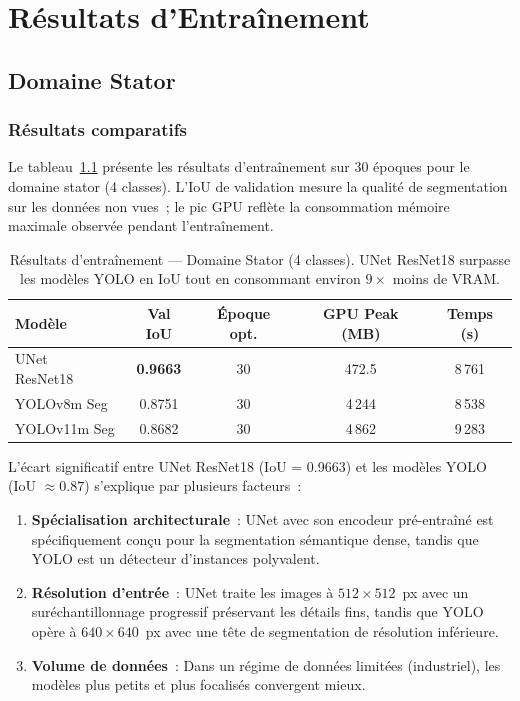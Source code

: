 \documentclass[12pt,a4paper]{report}
\begin{document}
\chapter{R\'esultats d'Entra\^inement}

\section{Domaine Stator}

\subsection{R\'esultats comparatifs}

Le tableau~\ref{tab:stator_results} pr\'esente les r\'esultats d'entra\^inement sur 30 \'epoques pour le domaine stator (4 classes). L'IoU de validation mesure la qualit\'e de segmentation sur les donn\'ees non vues~; le pic GPU refl\`ete la consommation m\'emoire maximale observ\'ee pendant l'entra\^inement.

\begin{table}[H]
\centering
\begin{tabular}{lcccc}
\toprule
\textbf{Mod\`ele} & \textbf{Val IoU} & \textbf{\'Epoque opt.} & \textbf{GPU Peak (MB)} & \textbf{Temps (s)} \\
\midrule
UNet ResNet18~\cite{ronneberger2015unet,he2016resnet}    & \textbf{0.9663}  & 30  & 472.5  & 8\,761 \\
YOLOv8m Seg~\cite{jocher2023yolov8}      & 0.8751           & 30  & 4\,244 & 8\,538 \\
YOLOv11m Seg     & 0.8682           & 30  & 4\,862 & 9\,283 \\
\bottomrule
\end{tabular}
\caption{R\'esultats d'entra\^inement --- Domaine Stator (4 classes). UNet ResNet18 surpasse les mod\`eles YOLO en IoU tout en consommant environ $9\times$ moins de VRAM.}
\label{tab:stator_results}
\end{table}

L'\'ecart significatif entre UNet ResNet18 (IoU = 0.9663) et les mod\`eles YOLO (IoU $\approx 0.87$) s'explique par plusieurs facteurs~:
\begin{enumerate}
    \item \textbf{Sp\'ecialisation architecturale}~: UNet avec son encodeur pr\'e-entra\^in\'e est sp\'ecifiquement con\c{c}u pour la segmentation s\'emantique dense, tandis que YOLO est un d\'etecteur d'instances polyvalent.
    \item \textbf{R\'esolution d'entr\'ee}~: UNet traite les images \`a $512\times512$~px avec un sur\'echantillonnage progressif pr\'eservant les d\'etails fins, tandis que YOLO op\`ere \`a $640\times640$~px avec une t\^ete de segmentation de r\'esolution inf\'erieure.
    \item \textbf{Volume de donn\'ees}~: Dans un r\'egime de donn\'ees limit\'ees (industriel), les mod\`eles plus petits et plus focalis\'es convergent mieux.
\end{enumerate}
\end{document}
